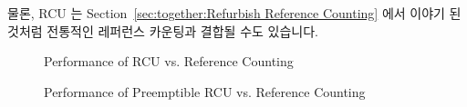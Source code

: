물론, RCU 는
Section~\ref{sec:together:Refurbish Reference Counting}
에서 이야기 된 것처럼 전통적인 레퍼런스 카운팅과 결합될 수도 있습니다.

\begin{figure}[tb]
\centering
{}
\caption{Performance of RCU vs. Reference Counting}
\label{fig:defer:Performance of RCU vs. Reference Counting}
\end{figure}

\begin{figure}[tb]
\centering
{}
\caption{Performance of Preemptible RCU vs. Reference Counting}
\label{fig:defer:Performance of Preemptible RCU vs. Reference Counting}
\end{figure}

